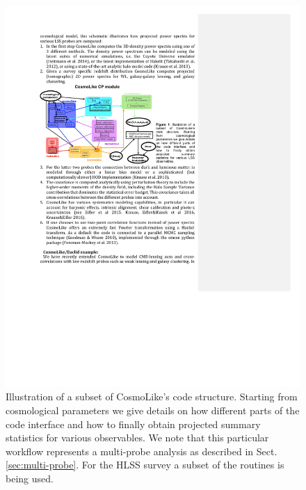 \begin{figure}
  \includegraphics[width=16.0cm]{Plots/forecasts/cosmolike_codestruct}
   \caption{Illustration of a subset of CosmoLike's code structure. Starting from cosmological parameters we give details on how different parts of the code interface and how to finally obtain projected summary statistics for various observables. We note that this particular workflow represents a multi-probe analysis as described in Sect. {\ref{sec:multi-probe}}. For the HLSS survey a subset of the routines is being used.
}
  \label{fi:fcosmolike}
\end{figure}

